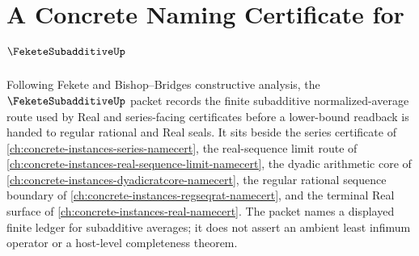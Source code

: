 \chapter{A Concrete Naming Certificate for $\FeketeSubadditiveUp$}
\label{ch:concrete-instances-fekete-subadditive-namecert}

Following Fekete and Bishop--Bridges constructive analysis, the $\FeketeSubadditiveUp$ packet records the finite subadditive normalized-average route used by Real and series-facing certificates before a lower-bound readback is handed to regular rational and Real seals. It sits beside the series certificate of \autoref{ch:concrete-instances-series-namecert}, the real-sequence limit route of \autoref{ch:concrete-instances-real-sequence-limit-namecert}, the dyadic arithmetic core of \autoref{ch:concrete-instances-dyadicratcore-namecert}, the regular rational sequence boundary of \autoref{ch:concrete-instances-regseqrat-namecert}, and the terminal Real surface of \autoref{ch:concrete-instances-real-namecert}. The packet names a displayed finite ledger for subadditive averages; it does not assert an ambient least infimum operator or a host-level completeness theorem.

